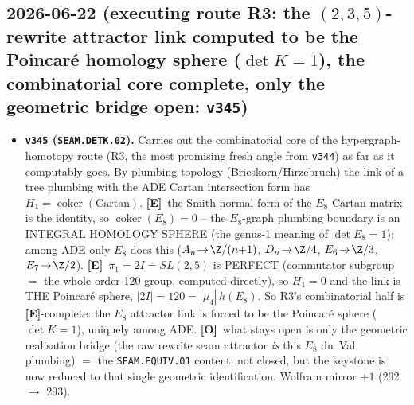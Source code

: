 \documentclass[11pt]{article}
\providecommand{\mE}{\textbf{[E]}}\providecommand{\mC}{\textbf{[C]}}
\providecommand{\mO}{\textbf{[O]}}\providecommand{\mX}{\textbf{[X]}}
\providecommand{\vref}[1]{\texttt{#1}}
\begin{document}
\subsection*{2026-06-22 (executing route R3: the $(2,3,5)$-rewrite attractor link computed to be the Poincar\'e homology sphere ($\det K{=}1$), the combinatorial core complete, only the geometric bridge open: \texttt{v345})}
\begin{itemize}
\item \textbf{\texttt{v345} (\texttt{SEAM.DETK.02}).} Carries out the combinatorial core of the hypergraph-homotopy
route (R3, the most promising fresh angle from \vref{v344}) as far as it computably goes. By plumbing topology
(Brieskorn/Hirzebruch) the link of a tree plumbing with the ADE Cartan intersection form has
$H_1=\operatorname{coker}(\mathrm{Cartan})$. \mE\ the Smith normal form of the $E_8$ Cartan matrix is the identity,
so $\operatorname{coker}(E_8)=0$ -- the $E_8$-graph plumbing boundary is an INTEGRAL HOMOLOGY SPHERE (the genus-1
meaning of $\det E_8{=}1$); among ADE only $E_8$ does this ($A_n\!\to\!\Z/(n{+}1)$, $D_n\!\to\!\Z/4$,
$E_6\!\to\!\Z/3$, $E_7\!\to\!\Z/2$). \mE\ $\pi_1=2I=SL(2,5)$ is PERFECT (commutator subgroup $=$ the whole order-120
group, computed directly), so $H_1=0$ and the link is THE Poincar\'e sphere, $|2I|=120=|\mu_4|\,h(E_8)$. So R3's
combinatorial half is \mE-complete: the $E_8$ attractor link is forced to be the Poincar\'e sphere ($\det K{=}1$),
uniquely among ADE. \mO\ what stays open is only the geometric realisation bridge (the raw rewrite seam attractor
\emph{is} this $E_8$ du~Val plumbing) $=$ the \texttt{SEAM.EQUIV.01} content; not closed, but the keystone is now
reduced to that single geometric identification. Wolfram mirror $+1$ (292 $\to$ 293).
\end{itemize}
\end{document}
